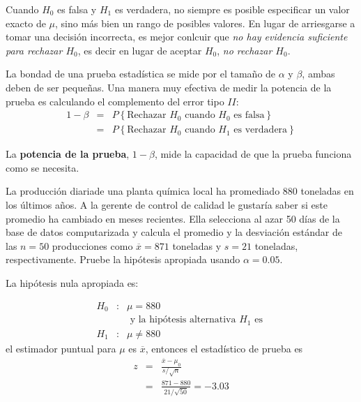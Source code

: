 \begin{Note}
Cuando $H_{0}$ es falsa y $H_{1}$ es verdadera, no siempre es posible especificar un valor exacto de $\mu$, sino m\'as bien un rango de posibles valores.\medskip
En lugar de arriesgarse a tomar una decisi\'on incorrecta, es mejor conlcuir que \textit{no hay evidencia suficiente para rechazar $H_{0}$}, es decir en lugar de aceptar $H_{0}$, \textit{no rechazar $H_{0}$}.

\end{Note}






La bondad de una prueba estad\'istica se mide por el tama\~ no de $\alpha$ y $\beta$, ambas deben de ser peque\~ nas. Una manera muy efectiva de medir la potencia de la prueba es calculando el complemento del error tipo $II$:
\begin{eqnarray*}
1-\beta&= &P\left\{\textrm{Rechazar }H_{0}\textrm{ cuando }H_{0}\textrm{ es falsa}\right\}\\
&=&P\left\{\textrm{Rechazar }H_{0}\textrm{ cuando }H_{1}\textrm{ es verdadera}\right\}
\end{eqnarray*}
\begin{Def}
La \textbf{potencia de la prueba}, $1-\beta$, mide la capacidad de que la prueba funciona como se necesita.
\end{Def}







\begin{Ejem}
La producci\'on diariade una planta qu\'imica local ha promediado 880 toneladas en los \'ultimos a\~nos. A la gerente de control de calidad le gustar\'ia saber si este promedio ha cambiado en meses recientes. Ella selecciona al azar 50 d\'ias de la base de datos computarizada y calcula el promedio y la desviaci\'on est\'andar de las $n=50$  producciones como $\overline{x}=871$ toneladas y $s=21$ toneladas, respectivamente. Pruebe la hip\'otesis  apropiada usando $\alpha=0.05$.

\end{Ejem}






\begin{Sol}
La hip\'otesis nula apropiada es:

\begin{eqnarray*}
H_{0}&:& \mu=880\\
&&\textrm{ y la hip\'otesis alternativa }H_{1}\textrm{ es }\\
H_{1}&:& \mu\neq880
\end{eqnarray*}
el estimador puntual para $\mu$ es $\overline{x}$, entonces el estad\'istico de prueba es\medskip
\begin{eqnarray*}
z&=&\frac{\overline{x}-\mu_{0}}{s/\sqrt{n}}\\
&=&\frac{871-880}{21/\sqrt{50}}=-3.03
\end{eqnarray*}
\end{Sol}



